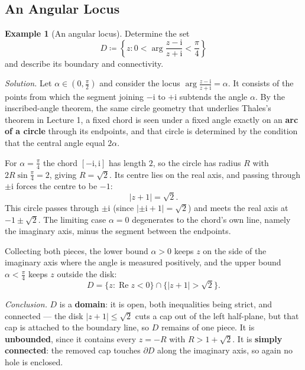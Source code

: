 \documentclass[11pt,a4paper]{article}
\theoremstyle{definition}
\newtheorem{example}{Example}
\theoremstyle{plain}
\begin{document}
\subsection{An Angular Locus}

\begin{example}[An angular locus]
Determine the set
\begin{equation}
D \coloneqq \left\{ z : 0 < \arg\frac{z - \mathrm{i}}{z + \mathrm{i}} < \frac{\pi}{4} \right\}
\end{equation}
and describe its boundary and connectivity.
\end{example}

\noindent\textit{Solution.} Let $\alpha \in (0, \frac{\pi}{2})$ and consider the locus $\arg\frac{z - \mathrm{i}}{z + \mathrm{i}} = \alpha$. It consists of the points from which the segment joining $-\mathrm{i}$ to $+\mathrm{i}$ subtends the angle $\alpha$. By the inscribed-angle theorem, the same circle geometry that underlies Thales's theorem in Lecture 1, a fixed chord is seen under a fixed angle exactly on an \textbf{arc of a circle} through its endpoints, and that circle is determined by the condition that the central angle equal $2\alpha$.

For $\alpha = \frac{\pi}{4}$ the chord $[-\mathrm{i}, \mathrm{i}]$ has length $2$, so the circle has radius $R$ with $2R\sin\frac{\pi}{4} = 2$, giving $R = \sqrt{2}$. Its centre lies on the real axis, and passing through $\pm\mathrm{i}$ forces the centre to be $-1$:
\begin{equation}
|z + 1| = \sqrt{2}.
\end{equation}
This circle passes through $\pm\mathrm{i}$ (since $|\pm\mathrm{i} + 1| = \sqrt{2}$) and meets the real axis at $-1 \pm \sqrt{2}$. The limiting case $\alpha = 0$ degenerates to the chord's own line, namely the imaginary axis, minus the segment between the endpoints.

Collecting both pieces, the lower bound $\alpha > 0$ keeps $z$ on the side of the imaginary axis where the angle is measured positively, and the upper bound $\alpha < \frac{\pi}{4}$ keeps $z$ outside the disk:
\begin{equation}
D = \{ z : \operatorname{Re} z < 0 \} \cap \{ |z + 1| > \sqrt{2} \}.
\end{equation}

\noindent\textit{Conclusion.} $D$ is a \textbf{domain}: it is open, both inequalities being strict, and connected --- the disk $|z + 1| \le \sqrt{2}$ cuts a cap out of the left half-plane, but that cap is attached to the boundary line, so $D$ remains of one piece. It is \textbf{unbounded}, since it contains every $z = -R$ with $R > 1 + \sqrt{2}$. It is \textbf{simply connected}: the removed cap touches $\partial D$ along the imaginary axis, so again no hole is enclosed.
\end{document}
